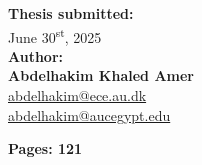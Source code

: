 \vspace{5ex}

\noindent\makebox[\linewidth]{{\rule{0.8\paperwidth}{4pt}}}

\vspace{5ex}


\begin{minipage}[t]{0.485\textwidth}
\begin{flushleft}


\textbf{Thesis submitted:} \\[5pt]\hspace{2ex}
June 30\textsuperscript{st}, 2025
\\[5pt]
\textbf{Author:} \\[2pt]\hspace*{2ex}
\textbf{Abdelhakim Khaled Amer} \\\hspace*{2ex}
\href{mailto:olaya@ece.au.dk}{abdelhakim@ece.au.dk}\\\hspace*{2ex}
\href{mailto:oat@eiva.com}{abdelhakim@aucegypt.edu}\\\hspace*{2ex}

\textbf{Pages: 121} \\
\end{flushleft}
\end{minipage}
\hfill
